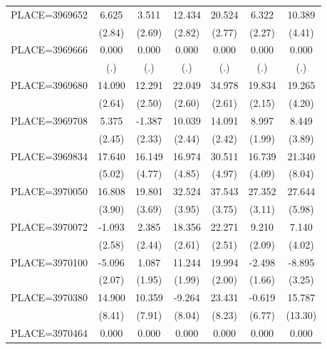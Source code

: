 {\begin{tabular}{l*{6}{c}}
PLACE=3969652       &       6.625&       3.511&      12.434&      20.524&       6.322&      10.389\\
                    &      (2.84)&      (2.69)&      (2.82)&      (2.77)&      (2.27)&      (4.41)\\
PLACE=3969666       &       0.000&       0.000&       0.000&       0.000&       0.000&       0.000\\
                    &         (.)&         (.)&         (.)&         (.)&         (.)&         (.)\\
PLACE=3969680       &      14.090&      12.291&      22.049&      34.978&      19.834&      19.265\\
                    &      (2.64)&      (2.50)&      (2.60)&      (2.61)&      (2.15)&      (4.20)\\
PLACE=3969708       &       5.375&      -1.387&      10.039&      14.091&       8.997&       8.449\\
                    &      (2.45)&      (2.33)&      (2.44)&      (2.42)&      (1.99)&      (3.89)\\
PLACE=3969834       &      17.640&      16.149&      16.974&      30.511&      16.739&      21.340\\
                    &      (5.02)&      (4.77)&      (4.85)&      (4.97)&      (4.09)&      (8.04)\\
PLACE=3970050       &      16.808&      19.801&      32.524&      37.543&      27.352&      27.644\\
                    &      (3.90)&      (3.69)&      (3.95)&      (3.75)&      (3.11)&      (5.98)\\
PLACE=3970072       &      -1.093&       2.385&      18.356&      22.271&       9.210&       7.140\\
                    &      (2.58)&      (2.44)&      (2.61)&      (2.51)&      (2.09)&      (4.02)\\
PLACE=3970100       &      -5.096&       1.087&      11.244&      19.994&      -2.498&      -8.895\\
                    &      (2.07)&      (1.95)&      (1.99)&      (2.00)&      (1.66)&      (3.25)\\
PLACE=3970380       &      14.900&      10.359&      -9.264&      23.431&      -0.619&      15.787\\
                    &      (8.41)&      (7.91)&      (8.04)&      (8.23)&      (6.77)&     (13.30)\\
PLACE=3970464       &       0.000&       0.000&       0.000&       0.000&       0.000&       0.000\\

\end{tabular}}
